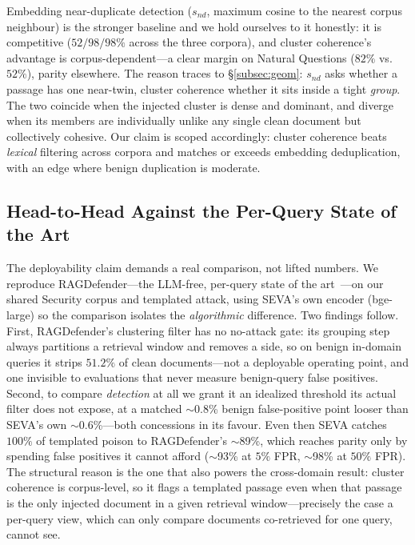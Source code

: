 \documentclass[10pt,journal,compsoc]{IEEEtran}
\begin{document}
Embedding near-duplicate detection ($s_{nd}$, maximum cosine to the nearest corpus neighbour) is
the stronger baseline and we hold ourselves to it honestly: it is competitive ($52/98/98\%$
across the three corpora), and cluster coherence's advantage is corpus-dependent---a clear
margin on Natural Questions ($82\%$ vs.\ $52\%$), parity elsewhere. The reason traces to
\S\ref{subsec:geom}: $s_{nd}$ asks whether a passage has one near-twin, cluster coherence
whether it sits inside a tight \emph{group}. The two coincide when the injected cluster is dense
and dominant, and diverge when its members are individually unlike any single clean document but
collectively cohesive. Our claim is scoped accordingly: cluster coherence beats \emph{lexical}
filtering across corpora and matches or exceeds embedding deduplication, with an edge where
benign duplication is moderate.

\subsection{Head-to-Head Against the Per-Query State of the Art}
\label{subsec:h2h}
The deployability claim demands a real comparison, not lifted numbers. We reproduce
RAGDefender---the LLM-free, per-query state of the art~\cite{ragdefender}---on our shared
Security corpus and templated attack, using SEVA's own encoder (bge-large) so the comparison
isolates the \emph{algorithmic} difference. Two findings follow. First,
RAGDefender's clustering filter has no no-attack gate: its grouping step always partitions a
retrieval window and removes a side, so on benign in-domain queries it strips $51.2\%$ of clean
documents---not a deployable operating point, and one invisible to evaluations that never
measure benign-query false positives. Second, to compare \emph{detection} at all we grant it an
idealized threshold its actual filter does not expose, at a matched $\sim$0.8\% benign
false-positive point looser than SEVA's own $\sim$0.6\%---both concessions in its favour. Even
then SEVA catches $100\%$ of templated poison to RAGDefender's $\sim$89\%, which reaches parity
only by spending false positives it cannot afford ($\sim$93\% at $5\%$ FPR, $\sim$98\% at
$50\%$ FPR).
The structural reason is the one that also powers the cross-domain result: cluster
coherence is corpus-level, so it flags a templated passage even when that passage
is the only injected document in a given retrieval window---precisely the case a
per-query view, which can only compare documents co-retrieved for one query, cannot
see.
\end{document}
